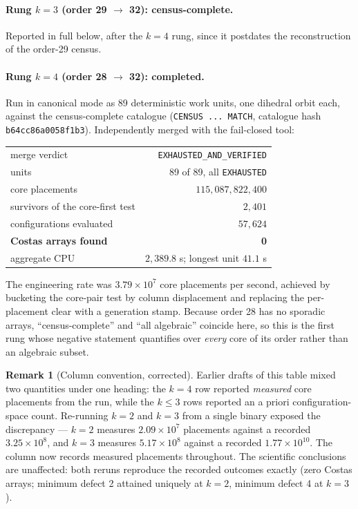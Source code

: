 \documentclass[11pt,a4paper]{article}
\theoremstyle{definition}
\newtheorem{remark}[theorem]{Remark}
\begin{document}
\paragraph{Rung $k=3$ (order 29 $\to$ 32): census-complete.}
Reported in full below, after the $k=4$ rung, since it postdates the
reconstruction of the order-29 census.

\paragraph{Rung $k=4$ (order 28 $\to$ 32): completed.}
Run in canonical mode as 89 deterministic work units, one dihedral orbit each,
against the census-complete catalogue (\texttt{CENSUS ... MATCH}, catalogue hash
\texttt{b64cc86a0058f1b3}). Independently merged with the fail-closed tool:

\begin{center}
\begin{tabular}{@{}lr@{}}
\toprule
merge verdict & \texttt{EXHAUSTED\_AND\_VERIFIED} \\
units & 89 of 89, all \texttt{EXHAUSTED} \\
core placements & $115{,}087{,}822{,}400$ \\
survivors of the core-first test & $2{,}401$ \\
configurations evaluated & $57{,}624$ \\
\textbf{Costas arrays found} & \textbf{0} \\
aggregate CPU & $2{,}389.8$ s; longest unit $41.1$ s \\
\bottomrule
\end{tabular}
\end{center}

\noindent The engineering rate was $3.79\times10^7$ core placements per second,
achieved by bucketing the core-pair test by column displacement and replacing the
per-placement clear with a generation stamp. Because order 28 has no sporadic
arrays, ``census-complete'' and ``all algebraic'' coincide here, so this is the
first rung whose negative statement quantifies over \emph{every} core of its
order rather than an algebraic subset.

\begin{remark}[Column convention, corrected]
\label{rem:colconv}
Earlier drafts of this table mixed two quantities under one heading: the $k=4$
row reported \emph{measured} core placements from the run, while the $k\le3$ rows
reported an a priori configuration-space count. Re-running $k=2$ and $k=3$ from a
single binary exposed the discrepancy --- $k=2$ measures $2.09\times10^{7}$
placements against a recorded $3.25\times10^{8}$, and $k=3$ measures
$5.17\times10^{8}$ against a recorded $1.77\times10^{10}$. The column now records
measured placements throughout. The scientific conclusions are unaffected: both
reruns reproduce the recorded outcomes exactly (zero Costas arrays; minimum
defect 2 attained uniquely at $k=2$, minimum defect 4 at $k=3$).
\end{remark}
\end{document}
